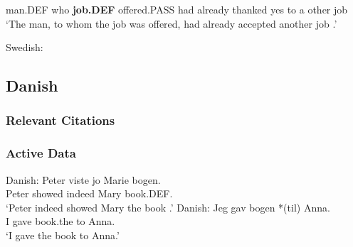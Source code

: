 \begin{exe}
\begin{xlist}
{			man.DEF who \textbf{job.DEF} offered.PASS had already thanked yes to a other job\\
			\trans `The man, to whom the job was offered, had already accepted another job \citep[ex. 52]{Lundquist.2004}.'}
		\end{xlist}
	 Swedish:
		\begin{xlist}
		\end{xlist}
\end{exe}



\subsection{Danish}
\subsubsection{Relevant Citations}
\subsubsection{Active Data}
\begin{exe}
	 Danish:
		\gll Peter viste jo Marie bogen.\\
		Peter showed indeed Mary book.DEF.\\
		\trans `Peter indeed showed Mary the book \citep{Vikner.1989}.'
	 Danish:
		\gll Jeg gav bogen *(til) Anna.\\
		I gave book.the to Anna.\\
		\trans `I gave the book to Anna\citep{Holmberg.1998}.'
\end{exe}
